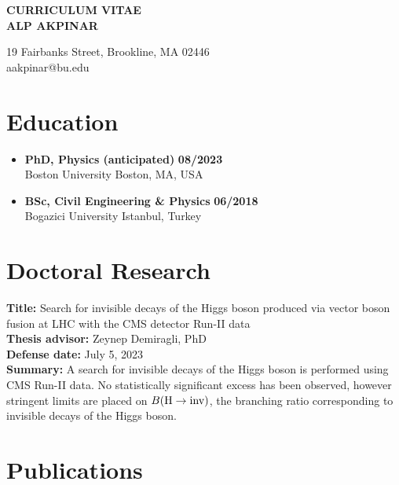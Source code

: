 

\begin{center}
{\LARGE {\bf CURRICULUM VITAE}}\\
\vspace{0.5in}
{\large {\bf ALP AKPINAR}}
\end{center}

\begin{center}
    19 Fairbanks Street, Brookline, MA 02446 \\
    aakpinar@bu.edu
\end{center}

\section*{Education}
\begin{itemize}
    \item \textbf{PhD, Physics (anticipated)} \hfill \textbf{08/2023} \\
    Boston University \hfill Boston, MA, USA 
    \item \textbf{BSc, Civil Engineering \& Physics} \hfill \textbf{06/2018} \\
    Bogazici University \hfill Istanbul, Turkey
\end{itemize}


\section*{Doctoral Research}

\textbf{Title:} Search for invisible decays of the Higgs boson produced via
vector boson fusion at LHC with the CMS detector Run-II data \\
\textbf{Thesis advisor:} Zeynep Demiragli, PhD \\
\textbf{Defense date:} July 5, 2023 \\
\textbf{Summary:} A search for invisible decays of the Higgs boson is performed using
CMS Run-II data. No statistically significant excess has been observed, however stringent
limits are placed on ${B(\textrm{H}\rightarrow\text{inv})}$, the branching ratio corresponding to invisible decays of the
Higgs boson.

\section*{Publications}

